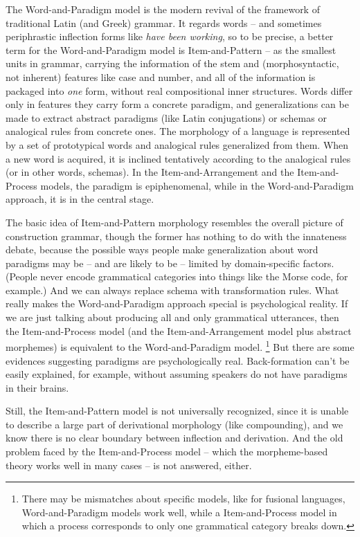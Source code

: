 \documentclass[UTF8, a4paper, oneside, scheme=plain]{ctexart}
\newcommand*{\corpus}[1]{\emph{#1}}
\begin{document}
The Word-and-Paradigm model is the modern revival of the framework of traditional Latin (and Greek) grammar.
It regards words 
-- and sometimes periphrastic inflection forms like \corpus{have been working},
so to be precise, a better term for the Word-and-Paradigm model is Item-and-Pattern
-- as the smallest units in grammar,
carrying the information of the stem 
and (morphosyntactic, not inherent) features like case and number,
and all of the information is packaged into \emph{one} form,
without real compositional inner structures.
Words differ only in features they carry 
form a concrete paradigm,
and generalizations can be made to extract 
abstract paradigms (like Latin conjugations) or schemas or analogical rules
from concrete ones.
The morphology of a language is represented by a set of prototypical words 
and analogical rules generalized from them.
When a new word is acquired, 
it is inclined tentatively according to the analogical rules (or in other words, schemas).
In the Item-and-Arrangement and the Item-and-Process models,
the paradigm is epiphenomenal,
while in the Word-and-Paradigm approach, 
it is in the central stage.

The basic idea of Item-and-Pattern morphology resembles the overall picture of construction grammar,
though the former has nothing to do with the innateness debate,
because the possible ways people make generalization about word paradigms
may be -- and are likely to be -- limited by domain-specific factors.
(People never encode grammatical categories into things like the Morse code, for example.)
And we can always replace schema with transformation rules.
What really makes the Word-and-Paradigm approach special 
is psychological reality.
If we are just talking about producing all and only grammatical utterances,
then the Item-and-Process model (and the Item-and-Arrangement model plus abstract morphemes)
is equivalent to the Word-and-Paradigm model.%
\footnote{
    There may be mismatches about specific models,
    like for fusional languages,
    Word-and-Paradigm models work well, 
    while a Item-and-Process model in which a process corresponds to only one grammatical category 
    breaks down.
}
But there are some evidences suggesting paradigms are psychologically real.
Back-formation can't be easily explained, for example,
without assuming speakers do not have paradigms in their brains.

Still, the Item-and-Pattern model is not universally recognized,
since it is unable to describe a large part of derivational morphology (like compounding),
and we know there is no clear boundary between inflection and derivation. %
And the old problem faced by the Item-and-Process model --
which the morpheme-based theory works well in many cases -- 
is not answered, either.
\end{document}
